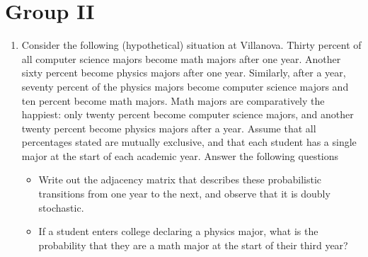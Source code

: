 \documentclass[12pt]{article}
\begin{document}
\section*{Group II}
\begin{enumerate}
\item 
Consider the following (hypothetical) situation at Villanova. Thirty percent of all computer science majors become math majors after one year. Another sixty percent become physics majors after one year. Similarly, after a year, seventy percent of the physics majors become computer science majors and ten percent become math majors. Math majors are comparatively the happiest: only twenty percent become computer science majors, and another twenty percent become physics majors after a year. Assume that all percentages stated are mutually exclusive, and that each student has a single major at the start of each academic year. Answer the following questions
\begin{itemize}
    \item Write out the adjacency matrix that describes these probabilistic transitions from one year to the next, and observe that it is doubly stochastic.
    \item If a student enters college declaring a physics major, what is the probability that they are a math major at the start of their third year? 
\end{itemize}
\end{enumerate}
\end{document}
